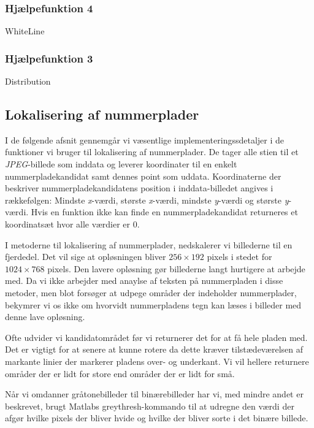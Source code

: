 \subsubsection{Hjælpefunktion 4}
WhiteLine 
\subsubsection{Hjælpefunktion 3}
Distribution


\subsection{Lokalisering af nummerplader}
I de følgende afsnit gennemgår vi væsentlige implementeringssdetaljer i de funktioner vi bruger til lokalisering af nummerplader. De tager alle stien til et \textit{JPEG}-billede som inddata og leverer koordinater til en enkelt nummerpladekandidat samt dennes point som uddata. Koordinaterne der beskriver nummerpladekandidatens position i inddata-billedet angives i rækkefølgen: Mindste \textit{x}-værdi, største \textit{x}-værdi, mindste \textit{y}-værdi og største \textit{y}-værdi. Hvis en funktion ikke kan finde en nummerpladekandidat returneres et koordinatsæt hvor alle værdier er $0$.

I metoderne til lokalisering af nummerplader, nedskalerer vi billederne til en fjerdedel. Det vil sige at opløsningen bliver $256 \times 192$ pixels i stedet for $1024 \times 768$ pixels. Den lavere opløsning gør billederne langt hurtigere at arbejde med. Da vi ikke arbejder med anaylse af teksten på nummerpladen i disse metoder, men blot forsøger at udpege områder der indeholder nummerplader, bekymrer vi os ikke om hvorvidt nummerpladens tegn kan læses i billeder med denne lave opløsning.


Ofte udvider vi kandidatområdet før vi returnerer det for at få hele pladen med. Det er vigtigt for at senere at kunne rotere da dette kræver tilstædeværelsen af markante linier der markerer pladens over- og underkant. Vi vil hellere returnere områder der er lidt for store end områder der er lidt for små.%

Når vi omdanner gråtonebilleder til binærebilleder har vi, med mindre andet er beskrevet, brugt Matlabs greythresh-kommando til at udregne den værdi der afgør hvilke pixels der bliver hvide og hvilke der bliver sorte i det binære billede.

